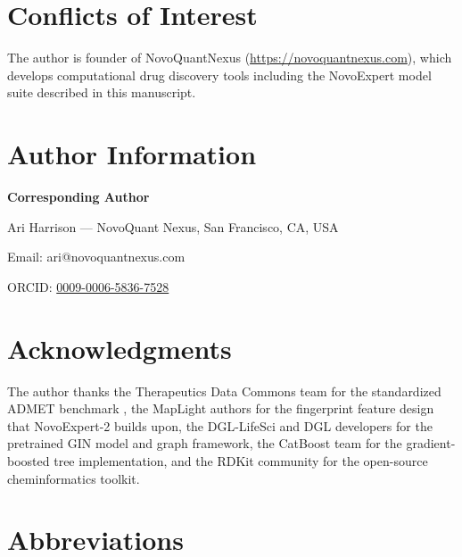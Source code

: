 \documentclass[11pt]{article}
\begin{document}
\section*{Conflicts of Interest}

The author is founder of NovoQuantNexus (\url{https://novoquantnexus.com}), which develops computational drug discovery tools including the NovoExpert model suite described in this manuscript.

\section*{Author Information}

\textbf{Corresponding Author}

Ari Harrison --- NovoQuant Nexus, San Francisco, CA, USA

Email: ari@novoquantnexus.com

ORCID: \href{https://orcid.org/0009-0006-5836-7528}{0009-0006-5836-7528}

\section*{Acknowledgments}

The author thanks the Therapeutics Data Commons team for the standardized ADMET benchmark \citep{huang2021therapeutics}, the MapLight authors \citep{notwell2023maplight} for the fingerprint feature design that NovoExpert-2 builds upon, the DGL-LifeSci \citep{li2021dgllife} and DGL \citep{wang2019dgl} developers for the pretrained GIN model and graph framework, the CatBoost team \citep{prokhorenkova2018catboost} for the gradient-boosted tree implementation, and the RDKit community \citep{landrum2013rdkit} for the open-source cheminformatics toolkit.

\section*{Abbreviations}
\end{document}
